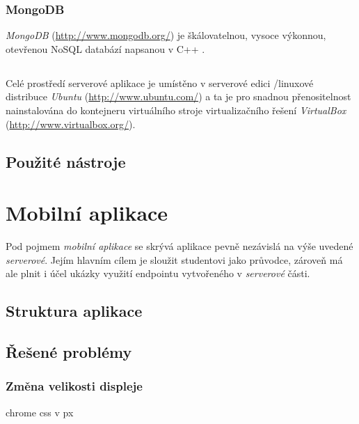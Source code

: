 \subsubsection{MongoDB}
\emph{MongoDB} (\url{http://www.mongodb.org/}) je škálovatelnou, vysoce výkonnou, otevřenou NoSQL databází napsanou v C++ \cite{Mongo}.

\subsection*{ }
Celé prostředí serverové aplikace je umístěno v serverové edici /linuxové distribuce \emph{Ubuntu} (\url{http://www.ubuntu.com/}) a ta je pro snadnou přenositelnost nainstalována do kontejneru virtuálního stroje virtualizačního řešení \emph{VirtualBox} (\url{http://www.virtualbox.org/}).

\subsection{Použité nástroje}





\section{Mobilní aplikace}
Pod pojmem \textit{mobilní aplikace} se skrývá aplikace pevně nezávislá na výše uvedené \textit{serverové}. Jejím hlavním cílem je sloužit studentovi   jako průvodce, zároveň má ale plnit i účel ukázky využití  endpointu vytvořeného v \textit{serverové} části.


\subsection{Struktura aplikace}


\subsection{Řešené problémy}

\subsubsection{Změna velikosti displeje}
chrome css v px

